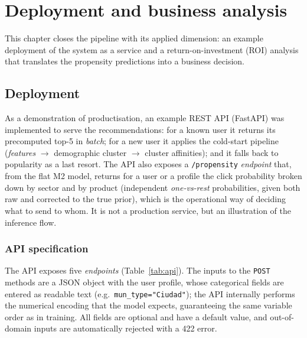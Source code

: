 \chapter{Deployment and business analysis}
\label{cap:negocio}

This chapter closes the pipeline with its applied dimension: an example deployment of the system as a service and a return-on-investment (ROI) analysis that translates the propensity predictions into a business decision.

\section{Deployment}

As a demonstration of productisation, an example REST API (FastAPI) was implemented to serve the recommendations: for a known user it returns its precomputed top-5 in \textit{batch}; for a new user it applies the cold-start pipeline (\textit{features} $\rightarrow$ demographic cluster $\rightarrow$ cluster affinities); and it falls back to popularity as a last resort. The API also exposes a \texttt{/propensity} \textit{endpoint} that, from the flat M2 model, returns for a user or a profile the click probability broken down by sector and by product (independent \textit{one-vs-rest} probabilities, given both raw and corrected to the true prior), which is the operational way of deciding what to send to whom. It is not a production service, but an illustration of the inference flow.

\subsection{API specification}

The API exposes five \textit{endpoints} (Table~\ref{tab:api}). The inputs to the \texttt{POST} methods are a JSON object with the user profile, whose categorical fields are entered as readable text (e.g.\ \texttt{mun\_type="Ciudad"}); the API internally performs the numerical encoding that the model expects, guaranteeing the same variable order as in training. All fields are optional and have a default value, and out-of-domain inputs are automatically rejected with a 422 error.

